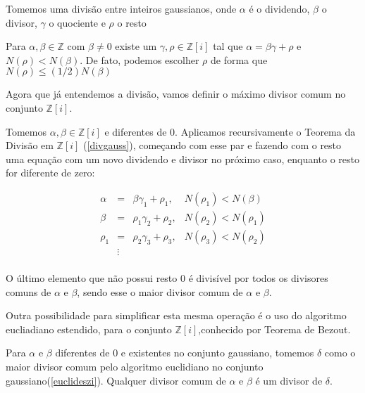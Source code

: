 Tomemos uma divis\~ao entre inteiros gaussianos, onde $\alpha$ \'e o dividendo, $\beta$ o divisor, $\gamma$ o quociente e $\rho$ o resto

\begin{Th}  \label{divgauss}

Para $ \alpha, \beta \in \mathbb{Z} $ com $\beta \neq 0$ existe um $\gamma, \rho \in \mathbb{Z}[i]$ tal que $\alpha = \beta \gamma + \rho$ e $N(\rho) < N(\beta)$. De fato, podemos escolher $\rho$  de forma que $N(\rho) \leq (1/2)N(\beta)$

\end{Th}

Agora que j\'a entendemos a divis\~ao, vamos definir o m\'aximo divisor comum no conjunto $\mathbb{Z}[i]$.

\begin{Th}
\label{euclideszi}

Tomemos $\alpha , \beta \in \mathbb{Z}[i]$ e diferentes de $0$. Aplicamos recursivamente o Teorema da Divis\~ao em $\mathbb{Z}[i]$ (\ref{divgauss}), come\c{c}ando com esse par e fazendo com o resto uma  equa\c{c}\~ao com um novo dividendo e divisor no pr\'oximo caso, enquanto o resto for diferente de zero:

\[
\begin{array}{lcll}
\alpha & = & \beta \gamma_1 + \rho_1,  & N(\rho_1) < N(\beta)  \\
\beta  & = & \rho_1 \gamma_2 + \rho_2, & N(\rho_2) < N(\rho_1) \\
\rho_1 & = & \rho_2 \gamma_3 + \rho_3, & N(\rho_3) < N(\rho_2) \\
& \vdots &  &\\
\end{array}
\]

O \'ultimo elemento que n\~ao possui resto $0$ \'e divis\'ivel por todos os divisores comuns de $\alpha$ e $\beta$, sendo esse o maior divisor comum de $\alpha$ e $\beta$.

\end{Th}

Outra possibilidade para simplificar esta mesma opera\c{c}\~ao \'e o uso do algoritmo eucliadiano estendido, para o conjunto $\mathbb{Z}[i]$,conhecido por Teorema de Bezout.

\begin{Cor} \label{cor}
	Para $\alpha$ e $\beta$ diferentes de $0$ e existentes no conjunto gaussiano, tomemos $\delta$ como o maior divisor comum pelo algoritmo euclidiano no conjunto gaussiano(\ref{euclideszi}). Qualquer divisor comum de $\alpha$ e $\beta$ \'e um divisor de $\delta$.
\end{Cor}

